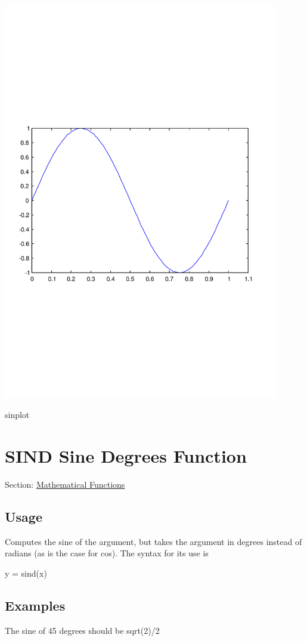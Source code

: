  
\begin{DoxyImage}
\includegraphics[width=12cm]{sinplot}
\caption{sinplot}
\end{DoxyImage}
 \hypertarget{mathfunctions_sind}{}\section{S\-I\-N\-D Sine Degrees Function}\label{mathfunctions_sind}
Section\-: \hyperlink{sec_mathfunctions}{Mathematical Functions} \hypertarget{vtkwidgets_vtkxyplotwidget_Usage}{}\subsection{Usage}\label{vtkwidgets_vtkxyplotwidget_Usage}
Computes the sine of the argument, but takes the argument in degrees instead of radians (as is the case for {\ttfamily cos}). The syntax for its use is \begin{DoxyVerb}   y = sind(x)
\end{DoxyVerb}
 \hypertarget{variables_matrix_Examples}{}\subsection{Examples}\label{variables_matrix_Examples}
The sine of 45 degrees should be {\ttfamily sqrt(2)/2}


